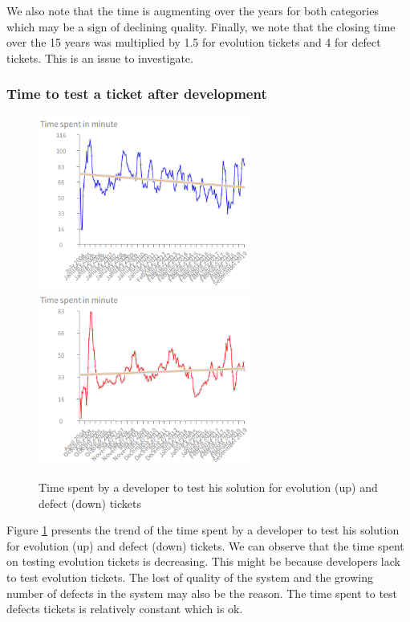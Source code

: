 \documentclass[10pt,conference]{IEEEtran}
\begin{document}
We also note that the time is augmenting over the years for both categories which may be a sign of declining quality.
Finally, we note that the closing time over the 15 years was multiplied by 1.5 for evolution tickets and 4 for defect tickets.
This is an issue to investigate.
\subsubsection{Time  to test a ticket after development}


 \begin{figure}[htbp]
  \centering
  \includegraphics[width=70mm]{./images/evolutionTest.png} \\
  \includegraphics[width=70mm]{./images/timeDevTest.png}
  \caption{Time spent by a developer to test his solution for  evolution (up) and defect (down) tickets}
  \label{fig:devTimeTest}
\end{figure}
Figure \ref{fig:devTimeTest} presents the trend of the time spent by a developer to test his solution for evolution (up) and defect (down) tickets.
We can observe that the time spent on testing evolution tickets is decreasing. 
This might be because developers lack to test evolution tickets. The lost of quality of the system and the growing number of defects in the system may also be the reason.
The time spent to test defects tickets is relatively constant which is ok.
 
\end{document}
